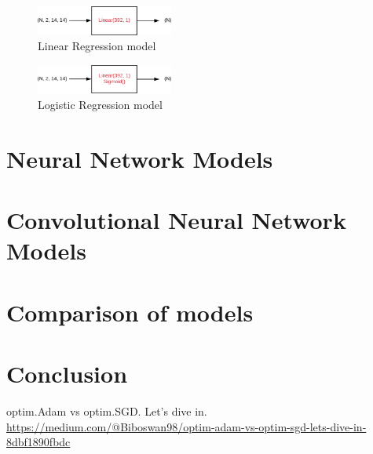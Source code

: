 \documentclass[journal, a4paper]{IEEEtran}
\begin{document}


\begin{figure}[!h]
    \centering
    \includegraphics[width=0.4\textwidth]{linearregression.png}
    \caption{Linear Regression model}
    \label{fig:linearregression}
\end{figure}

\begin{figure}[!h]
    \centering
    \includegraphics[width=0.4\textwidth]{logistic.png}
    \caption{Logistic Regression model}
    \label{fig:logisticregression}
\end{figure}

\section{Neural Network Models}
\label{sec:nnmodel}

\section{Convolutional Neural Network Models}
\label{sec:cnnmodel}

\section{Comparison of models}
\label{sec:comparison}

\section{Conclusion}
\label{sec:conclusion}



\begin{thebibliography}{999}

    	optim.Adam vs optim.SGD. Let’s dive in.
    	\url{https://medium.com/@Biboswan98/optim-adam-vs-optim-sgd-lets-dive-in-8dbf1890fbdc}
	
	    

\end{thebibliography}

\end{document}
